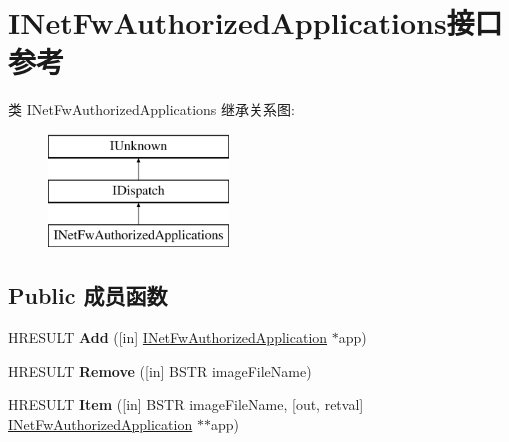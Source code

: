 \hypertarget{interface_i_net_fw_authorized_applications}{}\section{I\+Net\+Fw\+Authorized\+Applications接口 参考}
\label{interface_i_net_fw_authorized_applications}
类 I\+Net\+Fw\+Authorized\+Applications 继承关系图\+:\begin{figure}[H]
\begin{center}
\leavevmode
\includegraphics[height=3.000000cm]{interface_i_net_fw_authorized_applications}
\end{center}
\end{figure}
\subsection*{Public 成员函数}
\begin{DoxyCompactItemize}
\item 
\mbox{\label{interface_i_net_fw_authorized_applications_a49f9d18188feabb92221562ae454570f}} 
H\+R\+E\+S\+U\+LT {\bfseries Add} (\mbox{[}in\mbox{]} \hyperlink{interface_i_net_fw_authorized_application}{I\+Net\+Fw\+Authorized\+Application} $\ast$app)
\item 
\mbox{\label{interface_i_net_fw_authorized_applications_ab7c9f6196b1e2adf87f4686e6ff96772}} 
H\+R\+E\+S\+U\+LT {\bfseries Remove} (\mbox{[}in\mbox{]} B\+S\+TR image\+File\+Name)
\item 
\mbox{\label{interface_i_net_fw_authorized_applications_a07aaa04cd346852dcc00d0b64fd639bb}} 
H\+R\+E\+S\+U\+LT {\bfseries Item} (\mbox{[}in\mbox{]} B\+S\+TR image\+File\+Name, \mbox{[}out, retval\mbox{]} \hyperlink{interface_i_net_fw_authorized_application}{I\+Net\+Fw\+Authorized\+Application} $\ast$$\ast$app)
\end{DoxyCompactItemize}
